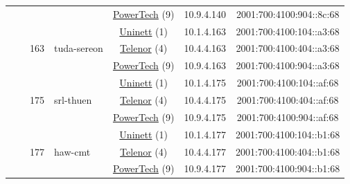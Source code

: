 \begin{small}
\begin{center}
\begin{longtable}{|c|c|c|c|c|c|c|c|}
  &  &  &  & \multicolumn{2}{|c|}{\tiny{\href{http://www.powertech.no}{PowerTech} (9)}} & \tiny{10.9.4.140} & \tiny{2001:700:4100:904::8c:68} \\* \cline{3-3}\cline{4-4}\cline{5-5}\cline{6-6}\cline{7-7}\cline{8-8}
  &  & \multirow{3}{*}{\tiny{163}} & \multicolumn{1}{|l|}{\multirow{3}{*}{\tiny{tuda-sereon}}} & \multicolumn{2}{|c|}{\tiny{\href{https://www.uninett.no}{Uninett} (1)}} & \tiny{10.1.4.163} & \tiny{2001:700:4100:104::a3:68} \\* \cline{5-5}\cline{6-6}\cline{7-7}\cline{8-8}
  &  &  &  & \multicolumn{2}{|c|}{\tiny{\href{https://www.telenor.no}{Telenor} (4)}} & \tiny{10.4.4.163} & \tiny{2001:700:4100:404::a3:68} \\* \cline{5-5}\cline{6-6}\cline{7-7}\cline{8-8}
  &  &  &  & \multicolumn{2}{|c|}{\tiny{\href{http://www.powertech.no}{PowerTech} (9)}} & \tiny{10.9.4.163} & \tiny{2001:700:4100:904::a3:68} \\* \cline{3-3}\cline{4-4}\cline{5-5}\cline{6-6}\cline{7-7}\cline{8-8}
  &  & \multirow{3}{*}{\tiny{175}} & \multicolumn{1}{|l|}{\multirow{3}{*}{\tiny{srl-thuen}}} & \multicolumn{2}{|c|}{\tiny{\href{https://www.uninett.no}{Uninett} (1)}} & \tiny{10.1.4.175} & \tiny{2001:700:4100:104::af:68} \\* \cline{5-5}\cline{6-6}\cline{7-7}\cline{8-8}
  &  &  &  & \multicolumn{2}{|c|}{\tiny{\href{https://www.telenor.no}{Telenor} (4)}} & \tiny{10.4.4.175} & \tiny{2001:700:4100:404::af:68} \\* \cline{5-5}\cline{6-6}\cline{7-7}\cline{8-8}
  &  &  &  & \multicolumn{2}{|c|}{\tiny{\href{http://www.powertech.no}{PowerTech} (9)}} & \tiny{10.9.4.175} & \tiny{2001:700:4100:904::af:68} \\* \cline{3-3}\cline{4-4}\cline{5-5}\cline{6-6}\cline{7-7}\cline{8-8}
  &  & \multirow{3}{*}{\tiny{177}} & \multicolumn{1}{|l|}{\multirow{3}{*}{\tiny{haw-cmt}}} & \multicolumn{2}{|c|}{\tiny{\href{https://www.uninett.no}{Uninett} (1)}} & \tiny{10.1.4.177} & \tiny{2001:700:4100:104::b1:68} \\* \cline{5-5}\cline{6-6}\cline{7-7}\cline{8-8}
  &  &  &  & \multicolumn{2}{|c|}{\tiny{\href{https://www.telenor.no}{Telenor} (4)}} & \tiny{10.4.4.177} & \tiny{2001:700:4100:404::b1:68} \\* \cline{5-5}\cline{6-6}\cline{7-7}\cline{8-8}
  &  &  &  & \multicolumn{2}{|c|}{\tiny{\href{http://www.powertech.no}{PowerTech} (9)}} & \tiny{10.9.4.177} & \tiny{2001:700:4100:904::b1:68} \\* \cline{3-3}\cline{4-4}\cline{5-5}\cline{6-6}\cline{7-7}\cline{8-8}

\end{longtable}
\end{center}
\end{small}
